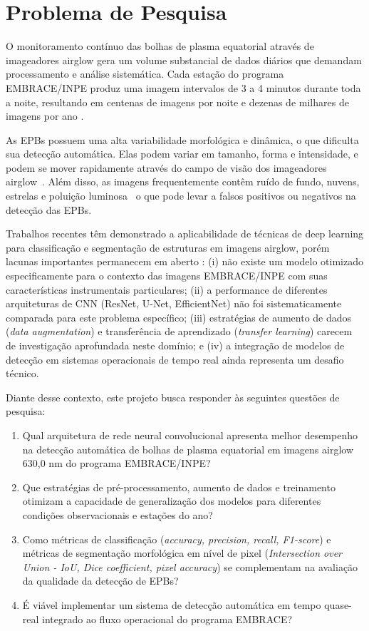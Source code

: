 \chapter{Problema de Pesquisa}

O monitoramento contínuo das bolhas de plasma equatorial através de imageadores airglow gera um volume substancial de dados diários que demandam processamento e análise sistemática. Cada estação do programa EMBRACE/INPE produz uma imagem intervalos de 3 a 4 minutos durante toda a noite, resultando em centenas de imagens por noite e dezenas de milhares de imagens por ano \cite{Githio2024}.

As EPBs possuem uma alta variabilidade morfológica e dinâmica, o que dificulta sua detecção automática. Elas podem variar em tamanho, forma e intensidade, e podem se mover rapidamente através do campo de visão dos imageadores airglow~\cite{Githio2024}. Além disso, as imagens frequentemente contêm ruído de fundo, nuvens, estrelas e poluição luminosa~\cite{Siddiqui2025} o que pode levar a falsos positivos ou negativos na detecção das EPBs.

Trabalhos recentes têm demonstrado a aplicabilidade de técnicas de deep learning para classificação e segmentação de estruturas em imagens airglow, porém lacunas importantes permanecem em aberto \cite{Githio2024}: (i) não existe um modelo otimizado especificamente para o contexto das imagens EMBRACE/INPE com suas características instrumentais particulares; (ii) a performance de diferentes arquiteturas de CNN (ResNet, U-Net, EfficientNet) não foi sistematicamente comparada para este problema específico; (iii) estratégias de aumento de dados (\textit{data augmentation}) e transferência de aprendizado (\textit{transfer learning}) carecem de investigação aprofundada neste domínio; e (iv) a integração de modelos de detecção em sistemas operacionais de tempo real ainda representa um desafio técnico.

Diante desse contexto, este projeto busca responder às seguintes questões de pesquisa:

\begin{enumerate}
\item Qual arquitetura de rede neural convolucional apresenta melhor desempenho na detecção automática de bolhas de plasma equatorial em imagens airglow 630,0 nm do programa EMBRACE/INPE?
\item Que estratégias de pré-processamento, aumento de dados e treinamento otimizam a capacidade de generalização dos modelos para diferentes condições observacionais e estações do ano?
\item Como métricas de classificação (\textit{accuracy, precision, recall, F1-score}) e métricas de segmentação morfológica em nível de pixel (\textit{Intersection over Union - IoU, Dice coefficient, pixel accuracy}) se complementam na avaliação da qualidade da detecção de EPBs?
\item É viável implementar um sistema de detecção automática em tempo quase-real integrado ao fluxo operacional do programa EMBRACE?
\end{enumerate}